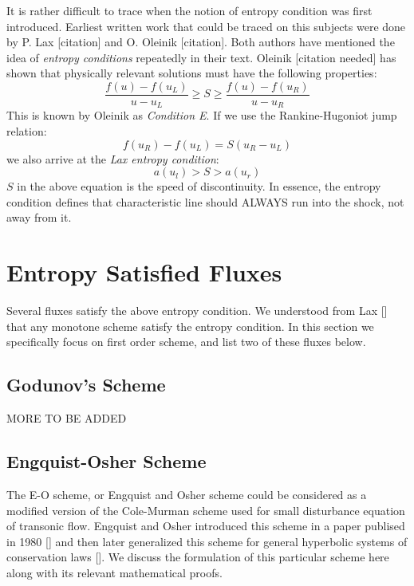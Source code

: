 \documentclass[a4paper]{article}
\begin{document}
It is rather difficult to trace when the notion of entropy condition was first introduced. Earliest written work that could be traced on this subjects were done by P. Lax [citation] and O. Oleinik [citation]. Both authors have mentioned the idea of \textit{entropy conditions} repeatedly in their text. Oleinik [citation needed] has shown that physically relevant solutions must have the following properties:
\begin{equation}
    \frac{f(u) - f(u_L)}{u-u_L} \geq S \geq \frac{f(u) - f(u_R)}{u-u_R}
\end{equation}
This is known by Oleinik as \textit{Condition E}. If we use the Rankine-Hugoniot jump relation:
\begin{equation}
    f(u_R) - f(u_L) = S(u_R - u_L)
\end{equation}
we also arrive at the \textit{Lax entropy condition}:
\begin{equation}
    a(u_l) > S > a(u_r)
\end{equation}
$S$ in the above equation is the speed of discontinuity. In essence, the entropy condition defines that characteristic line should ALWAYS run into the shock, not away from it. 

\section{Entropy Satisfied Fluxes}
Several fluxes satisfy the above entropy condition. We understood from Lax [] that any monotone scheme satisfy the entropy condition. In this section we specifically focus on first order scheme, and list two of these fluxes below.

\subsection{Godunov's Scheme}
MORE TO BE ADDED
\subsection{Engquist-Osher Scheme}
The E-O scheme, or Engquist and Osher scheme could be considered as a modified version of the Cole-Murman scheme used for small disturbance equation of transonic flow.  Engquist and Osher introduced this scheme in a paper publised in 1980 [] and then later generalized this scheme for general hyperbolic systems of conservation laws []. We discuss the formulation of this particular scheme here along with its relevant mathematical proofs.
\end{document}
